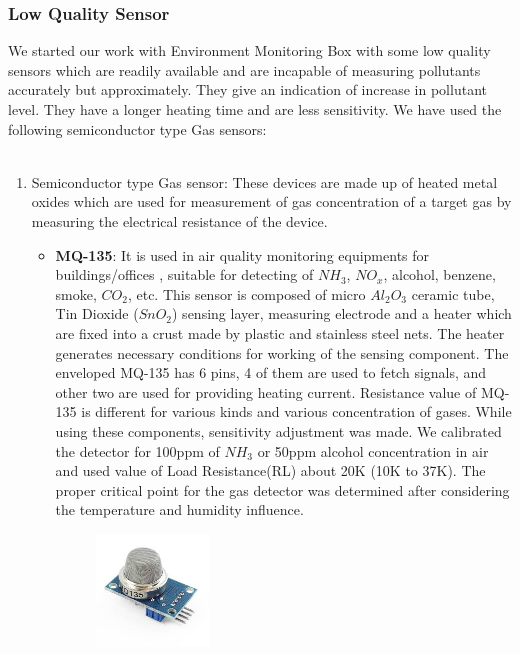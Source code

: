 \subsubsection{Low Quality Sensor}
We started our work with Environment Monitoring Box with some low quality sensors which are readily available and are incapable of measuring pollutants accurately but approximately. They give an indication of increase in pollutant level. They have a longer heating time and are less sensitivity. We have used the following semiconductor type Gas sensors:
\\
\\
\begin{enumerate}
	\item Semiconductor type Gas sensor: These devices are made up of heated metal oxides which are used for measurement of gas concentration of a target gas by measuring the electrical resistance of the device.
	\begin{itemize}
		\item \textbf{MQ-135}: It is used in air quality monitoring equipments for buildings/offices , suitable for detecting of $NH_3$, $NO_x$, alcohol, benzene, smoke, $CO_2$, etc. This sensor is composed of micro $Al_2O_3$ ceramic tube, Tin Dioxide ($SnO_2$) sensing layer, measuring electrode and a heater which are fixed into a crust made by plastic and stainless steel nets. The heater generates necessary conditions for working of the sensing component. The enveloped MQ-135 has 6 pins, 4 of them are used to fetch signals, and other two are used for providing heating current. Resistance value of MQ-135 is different for various kinds and various concentration of gases. While using these components, sensitivity adjustment was made. We calibrated the detector for 100ppm of $NH_3$ or 50ppm alcohol concentration in air and used value of Load Resistance(RL) about 20K (10K to 37K). The proper critical point for the gas detector was determined after considering the temperature and humidity influence.\\
		
		\begin{figure}[h]
		\centering
		\includegraphics[width=0.3\textwidth]{./mq135}\\[0.1in]
		\label{sensor MQ135}
		\end{figure}
		

\end{itemize}
\end{enumerate}
